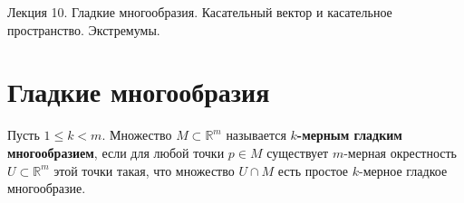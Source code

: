 \documentclass[11pt]{article}
\begin{document}
\begin{titlepage}
    \centering
    \vspace*{\fill}  %

    {\Huge Лекция 10. Гладкие многообразия. Касательный вектор и касательное пространство. Экстремумы.
    \par}

    \vspace*{\fill}  %
\end{titlepage}

\setcounter{page}{1}

\section{Гладкие многообразия}

\begin{definition}
    Пусть $1 \le k < m$. Множество $M \subset \mathbb{R}^m$ называется \textbf{$k$-мерным гладким многообразием}, если для любой точки $p \in M$ существует $m$-мерная окрестность $U \subset \mathbb{R}^m$ этой точки такая, что множество $U \cap M$ есть простое $k$-мерное гладкое многообразие.
\end{definition}
\end{document}
